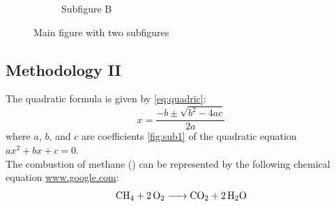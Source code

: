 \documentclass[10pt]{article}
\begin{document}
\begin{figure}[H]
\begin{subfigure}[b]{0.4\textwidth}
        \caption{Subfigure B}
        \label{fig:sub2}
    \end{subfigure}
    \caption{Main figure with two subfigures}
    \label{fig:main}
\end{figure}
















\newpage
\subsection{Methodology II}


The quadratic formula is given by \autoref{eq:quadric}:
\begin{equation}
    \label{eq:quadric}
    x = \frac{{-b \pm \sqrt{{b^2 - 4ac}}}}{{2a}}
\end{equation}
where $a$, $b$, and $c$ are coefficients \autoref{fig:sub1} of the quadratic equation $ax^2 + bx + c = 0$. \\








The combustion of methane () can be represented by the following chemical equation \url{www.google.com}:
\begin{equation}
    \ce{CH4 + 2O2 -> CO2 + 2H2O}
\end{equation}
\end{document}
